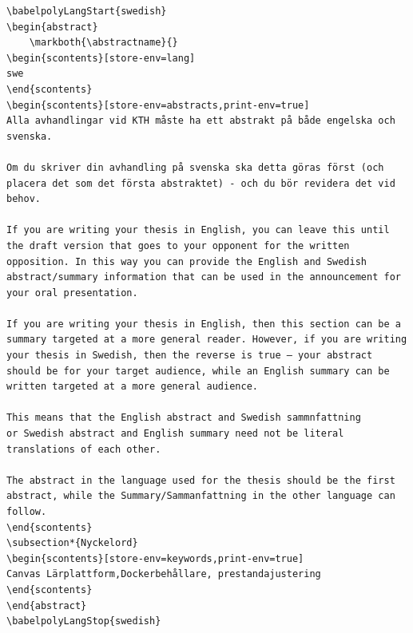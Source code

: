 \begin{lstlisting}[language={[LaTeX]TeX}, caption={Example of the revised format for entering an abstract}, label=lst:babel]
\babelpolyLangStart{swedish}
\begin{abstract}
    \markboth{\abstractname}{}
\begin{scontents}[store-env=lang]
swe
\end{scontents}
\begin{scontents}[store-env=abstracts,print-env=true]
Alla avhandlingar vid KTH måste ha ett abstrakt på både engelska och svenska.

Om du skriver din avhandling på svenska ska detta göras först (och placera det som det första abstraktet) - och du bör revidera det vid behov.

If you are writing your thesis in English, you can leave this until the draft version that goes to your opponent for the written opposition. In this way you can provide the English and Swedish abstract/summary information that can be used in the announcement for your oral presentation.

If you are writing your thesis in English, then this section can be a summary targeted at a more general reader. However, if you are writing your thesis in Swedish, then the reverse is true – your abstract should be for your target audience, while an English summary can be written targeted at a more general audience.

This means that the English abstract and Swedish sammnfattning  
or Swedish abstract and English summary need not be literal translations of each other.

The abstract in the language used for the thesis should be the first abstract, while the Summary/Sammanfattning in the other language can follow.
\end{scontents}
\subsection*{Nyckelord}
\begin{scontents}[store-env=keywords,print-env=true]
Canvas Lärplattform,Dockerbehållare, prestandajustering
\end{scontents}
\end{abstract}
\babelpolyLangStop{swedish}
\end{lstlisting}
	

